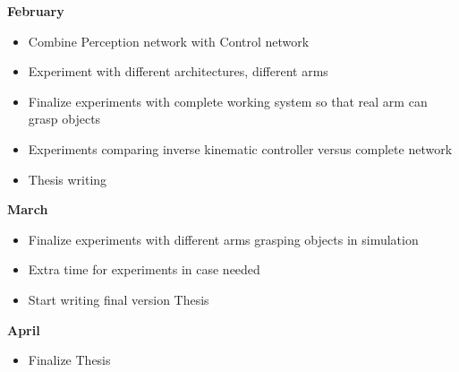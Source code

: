 \textbf{February}
\begin{itemize}
  \item Combine Perception network with Control network
  \item Experiment with different architectures, different arms
  \item Finalize experiments with complete working system so that real arm can grasp objects
  \item Experiments comparing inverse kinematic controller versus complete network
  \item Thesis writing
\end{itemize}
\textbf{March}
\begin{itemize}
  \item Finalize experiments with different arms grasping objects in simulation 
  \item Extra time for experiments in case needed
  \item Start writing final version Thesis
\end{itemize}
\textbf{April}
\begin{itemize}
  \item Finalize Thesis
\end{itemize}








  
  
